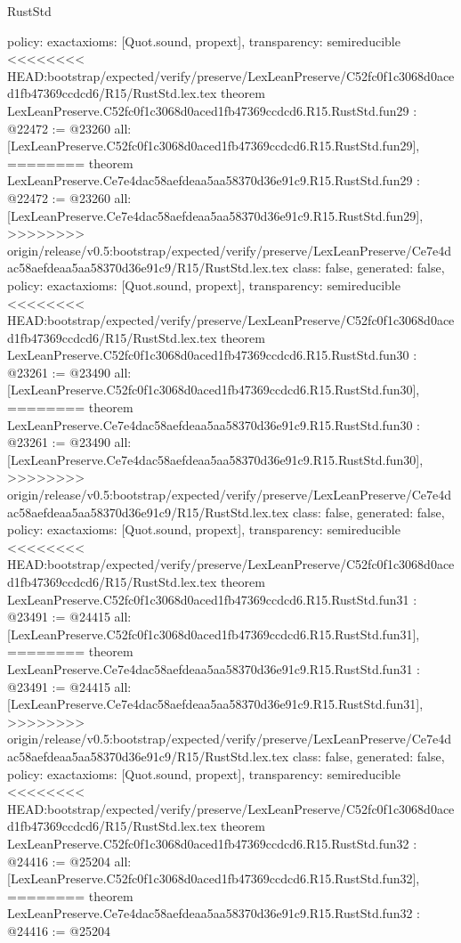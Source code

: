 \begin{lexlean}{RustStd}
\begin{coremodule}
{\begin{coremodule}
{{{{{{{{{{{{{{{{{{{{{{{{{{{{{{{{  policy: exact{axioms: [Quot.sound, propext]},
  transparency: semireducible
}
<<<<<<<< HEAD:bootstrap/expected/verify/preserve/LexLeanPreserve/C52fc0f1c3068d0aced1fb47369ccdcd6/R15/RustStd.lex.tex
theorem LexLeanPreserve.C52fc0f1c3068d0aced1fb47369ccdcd6.R15.RustStd.fun29 : @22472 := @23260 {
  all: [LexLeanPreserve.C52fc0f1c3068d0aced1fb47369ccdcd6.R15.RustStd.fun29],
========
theorem LexLeanPreserve.Ce7e4dac58aefdeaa5aa58370d36e91c9.R15.RustStd.fun29 : @22472 := @23260 {
  all: [LexLeanPreserve.Ce7e4dac58aefdeaa5aa58370d36e91c9.R15.RustStd.fun29],
>>>>>>>> origin/release/v0.5:bootstrap/expected/verify/preserve/LexLeanPreserve/Ce7e4dac58aefdeaa5aa58370d36e91c9/R15/RustStd.lex.tex
  class: false,
  generated: false,
  policy: exact{axioms: [Quot.sound, propext]},
  transparency: semireducible
}
<<<<<<<< HEAD:bootstrap/expected/verify/preserve/LexLeanPreserve/C52fc0f1c3068d0aced1fb47369ccdcd6/R15/RustStd.lex.tex
theorem LexLeanPreserve.C52fc0f1c3068d0aced1fb47369ccdcd6.R15.RustStd.fun30 : @23261 := @23490 {
  all: [LexLeanPreserve.C52fc0f1c3068d0aced1fb47369ccdcd6.R15.RustStd.fun30],
========
theorem LexLeanPreserve.Ce7e4dac58aefdeaa5aa58370d36e91c9.R15.RustStd.fun30 : @23261 := @23490 {
  all: [LexLeanPreserve.Ce7e4dac58aefdeaa5aa58370d36e91c9.R15.RustStd.fun30],
>>>>>>>> origin/release/v0.5:bootstrap/expected/verify/preserve/LexLeanPreserve/Ce7e4dac58aefdeaa5aa58370d36e91c9/R15/RustStd.lex.tex
  class: false,
  generated: false,
  policy: exact{axioms: [Quot.sound, propext]},
  transparency: semireducible
}
<<<<<<<< HEAD:bootstrap/expected/verify/preserve/LexLeanPreserve/C52fc0f1c3068d0aced1fb47369ccdcd6/R15/RustStd.lex.tex
theorem LexLeanPreserve.C52fc0f1c3068d0aced1fb47369ccdcd6.R15.RustStd.fun31 : @23491 := @24415 {
  all: [LexLeanPreserve.C52fc0f1c3068d0aced1fb47369ccdcd6.R15.RustStd.fun31],
========
theorem LexLeanPreserve.Ce7e4dac58aefdeaa5aa58370d36e91c9.R15.RustStd.fun31 : @23491 := @24415 {
  all: [LexLeanPreserve.Ce7e4dac58aefdeaa5aa58370d36e91c9.R15.RustStd.fun31],
>>>>>>>> origin/release/v0.5:bootstrap/expected/verify/preserve/LexLeanPreserve/Ce7e4dac58aefdeaa5aa58370d36e91c9/R15/RustStd.lex.tex
  class: false,
  generated: false,
  policy: exact{axioms: [Quot.sound, propext]},
  transparency: semireducible
}
<<<<<<<< HEAD:bootstrap/expected/verify/preserve/LexLeanPreserve/C52fc0f1c3068d0aced1fb47369ccdcd6/R15/RustStd.lex.tex
theorem LexLeanPreserve.C52fc0f1c3068d0aced1fb47369ccdcd6.R15.RustStd.fun32 : @24416 := @25204 {
  all: [LexLeanPreserve.C52fc0f1c3068d0aced1fb47369ccdcd6.R15.RustStd.fun32],
========
theorem LexLeanPreserve.Ce7e4dac58aefdeaa5aa58370d36e91c9.R15.RustStd.fun32 : @24416 := @25204 {
}}}}}}}}}}}}}}}}}}}}}}}}}}}}}}}}}}}}
\end{coremodule}}
\end{coremodule}
\end{lexlean}
